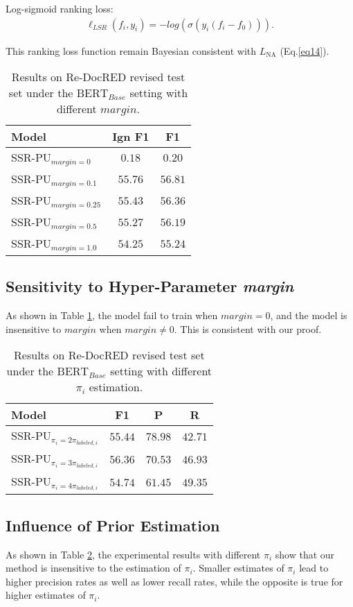 \documentclass[11pt]{article}
\begin{document}
Log-sigmoid ranking loss:
\begin{equation}
\begin{aligned}\label{eq22}
\ell_{LSR}(f_{i}, y_{i})=-log(\sigma(y_{i}(f_{i}-f_{0}))).
\end{aligned}
\end{equation}

This ranking loss function remain Bayesian consistent with $L_{\mathrm{NA}}$ (Eq.\ref{eq14}).

\begin{table}
\centering
\begin{tabular}{lcc}
\hline \textbf{Model} & \textbf{Ign F1} & \textbf{F1} \\
\hline
SSR-PU$_{margin=0}$ & $0.18$ & $0.20$ \\
SSR-PU$_{margin=0.1}$ & $55.76$ & $56.81$ \\
SSR-PU$_{margin=0.25}$ & $55.43$ & $56.36$ \\
SSR-PU$_{margin=0.5}$ & $55.27$ & $56.19$ \\
SSR-PU$_{margin=1.0}$ & $54.25$ & $55.24$ \\
\hline
\end{tabular}
\caption{\label{table8}
Results on Re-DocRED revised test set under the $\mathrm{BERT}_{Base}$ setting with different $margin$.
}
\end{table}

\subsection{Sensitivity to Hyper-Parameter \emph{margin}}

As shown in Table \ref{table8}, the model fail to train when $margin=0$, and the model is insensitive to $margin$ when $margin \neq 0$. This is consistent with our proof.

\begin{table}
\centering
\begin{tabular}{lccc}
\hline \textbf{Model} & \textbf{F1} & \textbf{P} & \textbf{R} \\
\hline
SSR-PU$_{\pi_{i}=2\pi_{labeled,i}}$ & $55.44$ & $78.98$ & $42.71$ \\
SSR-PU$_{\pi_{i}=3\pi_{labeled,i}}$ & $56.36$ & $70.53$ & $46.93$ \\
SSR-PU$_{\pi_{i}=4\pi_{labeled,i}}$ & $54.74$ & $61.45$ & $49.35$ \\
\hline
\end{tabular}
\caption{\label{table9}
Results on Re-DocRED revised test set under the $\mathrm{BERT}_{Base}$ setting with different $\pi_{i}$ estimation.
}
\end{table}

\subsection{Influence of Prior Estimation}
As shown in Table \ref{table9}, the experimental results with different $\pi_{i}$ show that our method is insensitive to the estimation of $\pi_{i}$. Smaller estimates of $\pi_{i}$ lead to higher precision rates as well as lower recall rates, while the opposite is true for higher estimates of $\pi_{i}$.
\end{document}
